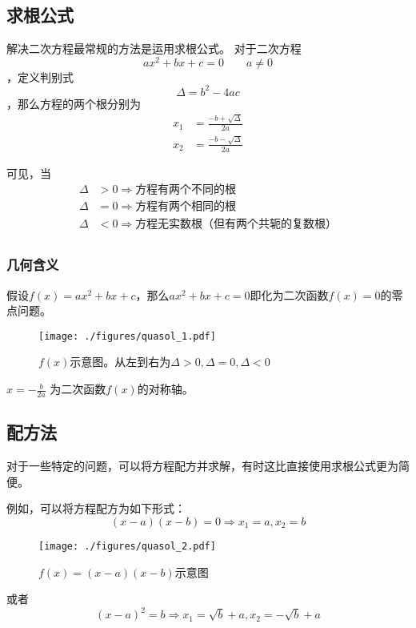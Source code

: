 
\subsection{求根公式}
解决二次方程最常规的方法是运用求根公式。
对于二次方程$$ax^2+bx+c=0 \qquad a\neq 0$$，定义判别式$$\Delta = b^2-4ac$$，那么方程的两个根分别为$$
\begin{aligned}
x_1&=\frac{-b+\sqrt{\Delta}}{2a}\\
x_2&=\frac{-b-\sqrt{\Delta}}{2a}
\end{aligned}
$$

可见，当
$$
\begin{aligned}
\Delta &> 0 \Rightarrow \text{方程有两个不同的根}\\
\Delta &= 0 \Rightarrow \text{方程有两个相同的根}\\
\Delta &< 0 \Rightarrow \text{方程无实数根（但有两个共轭的复数根）}\\
\end{aligned}
$$

\subsubsection{几何含义}
假设$f(x)=ax^2+bx+c$，那么$ax^2+bx+c=0$即化为二次函数$f(x)=0$的零点问题。
\begin{figure}[ht]
\centering
\texttt{[image: ./figures/quasol\_1.pdf]}
\caption{$f(x)$示意图。从左到右为$\Delta > 0, \Delta = 0, \Delta < 0$} \label{quasol_fig1}
\end{figure}
$x=-\frac{b}{2a}$ 为二次函数$f(x)$的对称轴。

\subsection{配方法}
对于一些特定的问题，可以将方程配方并求解，有时这比直接使用求根公式更为简便。

例如，可以将方程配方为如下形式：
$$(x-a)(x-b)=0\Rightarrow x_1=a, x_2=b$$
\begin{figure}[ht]
\centering
\texttt{[image: ./figures/quasol\_2.pdf]}
\caption{$f(x)=(x-a)(x-b)$示意图} \label{quasol_fig2}
\end{figure}

或者
$$(x-a)^2=b\Rightarrow x_1=\sqrt{b}+a, x_2=-\sqrt{b}+a$$
